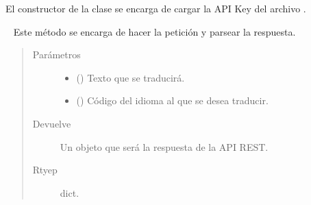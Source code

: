 \begin{fulllineitems}
El constructor de la clase se encarga de cargar la API Key del archivo
.

\begin{fulllineitems}
\label{\detokenize{chapter_two/desc_cloudnao:app.tpa_client_libraries.google_cloud_translation.GoogleCloudTranslation.translate}}~
Este método se encarga de hacer la petición y parsear la respuesta.
\begin{quote}\begin{description}
\item[{Parámetros}] \leavevmode\begin{itemize}
\item {} 
 () \textendash{} Texto que se traducirá.

\item {} 
 () \textendash{} Código del idioma al que se desea traducir.

\end{itemize}

\item[{Devuelve}] \leavevmode
Un objeto que será la respuesta de la API REST.

\item[{Rtyep}] \leavevmode
dict.

\end{description}\end{quote}

\end{fulllineitems}


\end{fulllineitems}

\label{\detokenize{chapter_two/desc_cloudnao:module-app.tpa_client_libraries.google_cloud_vision}}\label{\detokenize{chapter_two/desc_cloudnao:module-google_cloud_vision}}

